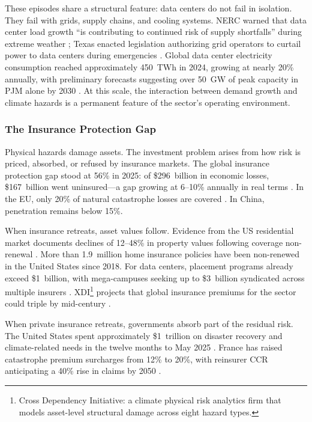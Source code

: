 \begin{twocolbody}
These episodes share a structural feature: data centers do not fail in isolation. They fail with grids, supply chains, and cooling systems. NERC warned that data center load growth ``is contributing to continued risk of supply shortfalls'' during extreme weather \citep{nerc2025}; Texas enacted legislation authorizing grid operators to curtail power to data centers during emergencies \citep{spokesman2025}. Global data center electricity consumption reached approximately 450~TWh in 2024, growing at nearly 20\% annually, with preliminary forecasts suggesting over 50~GW of peak capacity in PJM alone by 2030 \citep{iea2025energyai, nrdc2025datacenters}. At this scale, the interaction between demand growth and climate hazards is a permanent feature of the sector's operating environment.

\subsubsection*{The Insurance Protection Gap}

Physical hazards damage assets. The investment problem arises from how risk is priced, absorbed, or refused by insurance markets. The global insurance protection gap stood at 56\% in 2025: of \$296~billion in economic losses, \$167~billion went uninsured---a gap growing at 6--10\% annually in real terms \citep{gallagherre2026, swissre2025sigma}. In the EU, only 20\% of natural catastrophe losses are covered \citep{ecb_eiopa2024}. In China, penetration remains below 15\%.

When insurance retreats, asset values follow. Evidence from the US residential market documents declines of 12--48\% in property values following coverage non-renewal \citep{wwf2025}. More than 1.9~million home insurance policies have been non-renewed in the United States since 2018. For data centers, placement programs already exceed \$1~billion, with mega-campuses seeking up to \$3~billion syndicated across multiple insurers \citep{allianz2025}. XDI\footnote{Cross Dependency Initiative: a climate physical risk analytics firm that models asset-level structural damage across eight hazard types.} projects that global insurance premiums for the sector could triple by mid-century \citep{xdi2025}.

When private insurance retreats, governments absorb part of the residual risk. The United States spent approximately \$1~trillion on disaster recovery and climate-related needs in the twelve months to May 2025 \citep{wwf2025}. France has raised catastrophe premium surcharges from 12\% to 20\%, with reinsurer CCR anticipating a 40\% rise in claims by 2050 \citep{hoganlovells2025}.


\end{twocolbody}
